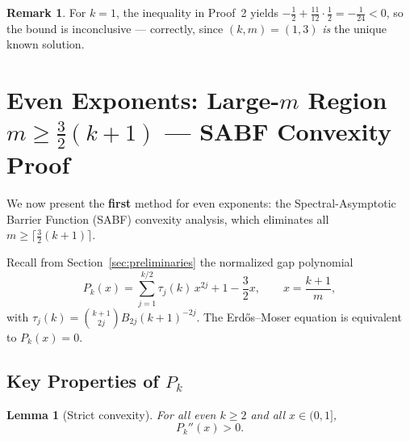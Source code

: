 \documentclass[12pt,a4paper]{article}
\theoremstyle{plain}
\newtheorem{lemma}[theorem]{Lemma}
\theoremstyle{definition}
\newtheorem{remark}[theorem]{Remark}
\begin{document}
\begin{remark}
  For $k=1$, the inequality in Proof~2 yields
  $-\frac{1}{2} + \frac{11}{12} \cdot \frac{1}{2} = -\frac{1}{24} < 0$,
  so the bound is inconclusive --- correctly, since $(k,m) = (1,3)$
  \emph{is} the unique known solution.
\end{remark}

\section{Even Exponents: Large-$m$ Region $m \ge \frac{3}{2}(k+1)$ --- SABF Convexity Proof}
\label{sec:even-largeM}

We now present the \textbf{first} method for even
exponents: the Spectral-Asymptotic Barrier Function (SABF) convexity
analysis, which eliminates all $m \ge \lceil\frac{3}{2}(k+1)\rceil$.

Recall from Section~\ref{sec:preliminaries} the normalized gap polynomial
\begin{equation}\label{eq:pk-def-recall}
  P_k(x) = \sum_{j=1}^{k/2} \tau_j(k) \, x^{2j}
          + 1 - \frac{3}{2}x,
  \qquad x = \frac{k+1}{m},
\end{equation}
with $\tau_j(k) = \binom{k+1}{2j} B_{2j} (k+1)^{-2j}$.
The Erd\H{o}s--Moser equation is equivalent to $P_k(x) = 0$.

\subsection{Key Properties of $P_k$}
\label{sec:pk-props}

\begin{lemma}[Strict convexity]\label{lem:pk-convex}
  For all even $k \ge 2$ and all $x \in (0, 1]$,
  \[
    P_k''(x) > 0.
  \]
\end{lemma}
\end{document}

